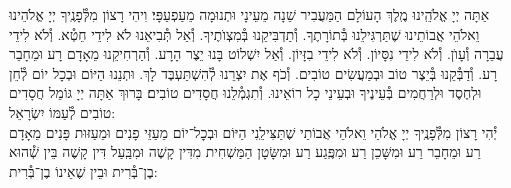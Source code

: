 \documentclass[twoside, openany, parskip=half, 11pt]{book}
\begin{document}
אַתָּה יְיָ אֱלֹהֵֽינוּ מֶֽלֶךְ הָעוֹלָם הַמַּעֲבִיר שֵׁנָה מֵעֵינָי וּתְנוּמָה מֵעַפְעַפָּי׃ וִיהִי רָצוֹן מִלְּ֯פָנֶֽיךָ יְיָ אֱלֹהֵינוּ וֵאלֹהֵי אֲבוֹתֵינוּ שֶׁתַּרְגִּילֵנוּ בְּ֯תוֹרָתֶךָ. וְ֯תַדְבִּיקֵנוּ בְּ֯מִצְוׂתֶיךָ. וְ֯אַל תְּ֯בִיאֵנוּ לֹא לִידֵי חֵטְ֯א. וְ֯לֹא לִידֵי עֲבֵרָה וְ֯עָוׂן. וְ֯לֹא לִידֵי נִסָּיוֹן. וְ֯לֹא לִידֵי בִזָּיוֹן. וְ֯אַל יִשְׁלוֹט בָּנוּ יֵצֶר הָרָע. וְ֯הַרְחִיקֵנוּ מֵאָדָם רָע וּמֵחָבֵר רָע. וְ֯דַבְּ֯קֵנוּ בְּ֯יֵצֶר טוֹב וּבְמַעֲשִׂים טוֹבִים. וְ֯כֹף אֶת יִצְרֵנוּ לְ֯הִשְׁתַּעְבֶּד לָךְ. וּתְנֵנוּ הַיּוֹם וּבְכָל יוֹם לְ֯חֵן וּלְחֶסֶד וּלְרַחֲמִים בְּ֯עֵינֶיךָ וּבְעֵינֵי כָל רוֹאֵינוּ. וְ֯תִגְמְ֯לֵנוּ חֲסָדִים טוֹבִים׃ בָּרוּךְ אַתָּה יְיָ גּוֹמֵל חֲסָדִים טוֹבִים לְ֯עַמּוֹ יִשְׂרָאֵל:\\
יְ֯הִי רָצוֹן מִלְּ֯פָנֶֽיךָ יְיָ אֱלֹהַי וֵאלֹהֵי אֲבוֹתַי שֶׁתַּצִּילֵֽנִי הַיּוֹם וּבְכׇל־יוֹם מֵעַזֵּי פָנִים וּמֵעַזּוּת פָּנִים מֵאָדָם רַע וּמֵחָבֵר רַע וּמִשָּׁכֵן רַע וּמִפֶּֽגַע רַע וּמִשָּׂטָן הַמַּשְׁחִית מִדִּין קָשֶׁה וּמִבַּֽעַל דִּין קָשֶׁה בֵּין שְׁ֯הוּא בֶן־בְּ֯רִית וּבֵין שֶׁאֵינוֹ בֶן־בְּ֯רִית:
\end{document}
